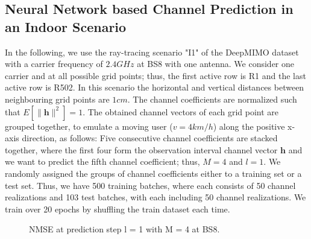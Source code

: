\documentclass[12pt, draftclsnofoot, onecolumn]{IEEEtran}
\begin{document}
\subsection{Neural Network based Channel Prediction in an Indoor Scenario}
\label{sec:illust}
In the following, we use the ray-tracing scenario "I1" of the DeepMIMO dataset with a carrier frequency of $2.4\si{GHz}$ at BS8 with one antenna. We consider one carrier and at all possible grid points; thus, the first active row is R1 and the last active row is R502. In this scenario the horizontal and vertical distances between neighbouring grid points are $1\si{cm}$. The channel coefficients are normalized such that $E[\| \mathbf{h} \|^2] = 1$. The obtained channel vectors of each grid point are grouped together, to emulate a moving user ($v = 4\si{km/h}$) along the positive x-axis direction, as follows: Five consecutive channel coefficients are stacked together, where the first four form the observation interval channel vector $\mathbf{h}$ and we want to predict the fifth channel coefficient; thus, $M=4$ and $l=1$. We randomly assigned the groups of channel coefficients either to a training set or a test set. Thus, we have 500 training batches, where each consists of 50 channel realizations and 103 test batches, with each including 50 channel realizations. We train over 20 epochs by shuffling the train dataset each time. 
\begin{figure}[t]
    \centering
\caption{NMSE at prediction step l = 1 with M = 4 at BS8.}
\label{fig:LCP25}
\end{figure}
\end{document}
